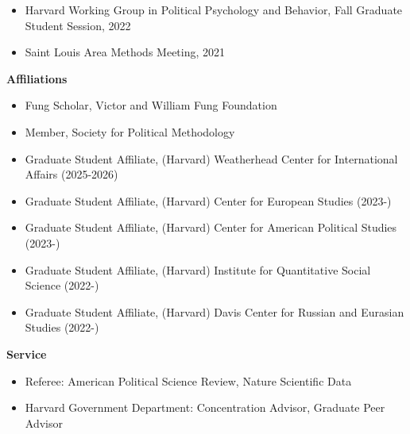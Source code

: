 \documentclass[12pt]{article}
\begin{document}
\begin{footnotesize}
\begin{itemize}[noitemsep,nolistsep]
\item Harvard Working Group in Political Psychology and Behavior, Fall Graduate Student Session, 2022

\item Saint Louis Area Methods Meeting, 2021

\end{itemize}


\vspace{5mm} 


{\bf {\normalsize Affiliations}}

\vspace{3mm} 

\begin{itemize}[noitemsep,nolistsep]

\item Fung Scholar, Victor and William Fung Foundation

\item Member, Society for Political Methodology

\item Graduate Student Affiliate, (Harvard) Weatherhead Center for International Affairs (2025-2026)

\item Graduate Student Affiliate, (Harvard) Center for European Studies (2023-)

\item Graduate Student Affiliate, (Harvard) Center for American Political Studies (2023-)

\item Graduate Student Affiliate, (Harvard) Institute for Quantitative Social Science (2022-)

\item Graduate Student Affiliate, (Harvard) Davis Center for Russian and Eurasian Studies (2022-)

\end{itemize}

\vspace{5mm} 


{\bf {\normalsize Service}}

\vspace{3mm} 

\begin{itemize}[noitemsep,nolistsep]
\item Referee: American Political Science Review, Nature Scientific Data
\item Harvard Government Department: Concentration Advisor, Graduate Peer Advisor 
\end{itemize}

\end{footnotesize}
\thispagestyle{empty}
\end{document}
